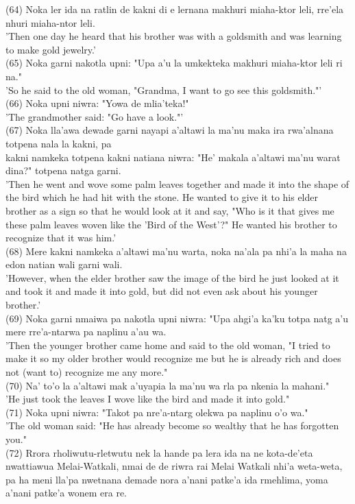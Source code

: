 \documentclass[10pt]{article}
\begin{document}
(64) Noka ler ida na ratlin de kakni di e lernana makhuri miaha-ktor leli, rre'ela nhuri miaha-ntor leli.\\
'Then one day he heard that his brother was with a goldsmith and was learning to make gold jewelry.'\\
(65) Noka garni nakotla upni: "Upa a'u la umkekteka makhuri miaha-ktor leli ri na."\\
'So he said to the old woman, "Grandma, I want to go see this goldsmith."'\\
(66) Noka upni niwra: "Yowa de mlia'teka!"\\
'The grandmother said: "Go have a look."'\\
(67) Noka lla'awa dewade garni nayapi a'altawi la ma'nu maka ira rwa'alnana totpena nala la kakni, pa\\
kakni namkeka totpena kakni natiana niwra: "He' makala a'altawi ma'nu warat dina?" totpena natga garni.\\
'Then he went and wove some palm leaves together and made it into the shape of the bird which he had hit with the stone. He wanted to give it to his elder brother as a sign so that he would look at it and say, "Who is it that gives me these palm leaves woven like the 'Bird of the West'?" He wanted his brother to recognize that it was him.'\\
(68) Mere kakni namkeka a'altawi ma'nu warta, noka na'ala pa nhi'a la maha na edon natian wali garni wali.\\
'However, when the elder brother saw the image of the bird he just looked at it and took it and made it into gold, but did not even ask about his younger brother.'\\
(69) Noka garni nmaiwa pa nakotla upni niwra: "Upa ahgi'a ka'ku totpa natg a'u mere rre'a-ntarwa pa naplinu a'au wa.\\
'Then the younger brother came home and said to the old woman, "I tried to make it so my older brother would recognize me but he is already rich and does not (want to) recognize me any more."\\
(70) Na' to'o la a'altawi mak a'uyapia la ma'nu wa rla pa nkenia la mahani."\\
'He just took the leaves I wove like the bird and made it into gold."\\
(71) Noka upni niwra: "Takot pa nre'a-ntarg olekwa pa naplinu o'o wa."\\
'The old woman said: "He has already become so wealthy that he has forgotten you."\\
(72) Rrora rholiwutu-rletwutu nek la hande pa lera ida na ne kota-de'eta nwattiawua Melai-Watkali, nmai de de riwra rai Melai Watkali nhi'a weta-weta, pa ha meni lla'pa nwetnana demade nora a'nani patke'a ida rmehlima, yoma a'nani patke'a wonem era re.\\
\end{document}
